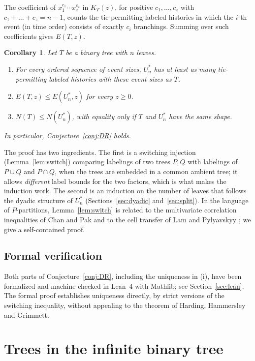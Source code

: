 \documentclass[11pt]{amsart}
\newtheorem{corollary}[theorem]{Corollary}
\theoremstyle{definition}
\theoremstyle{remark}
\begin{document}
The coefficient of $x_1^{c_1}\cdots x_z^{c_z}$ in $K_T(z)$, for positive $c_1,\dots,c_z$ with $c_1+\dots+c_z=n-1$, counts the tie-permitting labeled histories in which the $i$-th event (in time order) consists of exactly $c_i$ branchings.
Summing over such coefficients gives $E(T,z)$.

\begin{corollary}\label{cor:main}
Let $T$ be a binary tree with $n$ leaves.
\begin{enumerate}
\item For every ordered sequence of event sizes, $U^*_n$ has at least as many tie-permitting labeled histories with these event sizes as $T$.
\item $E(T,z)\le E(U^*_n,z)$ for every $z\ge 0$.
\item $N(T)\le N(U^*_n)$, with equality only if $T$ and $U^*_n$ have the same shape.
\end{enumerate}
In particular, Conjecture~\ref{conj:DR} holds.
\end{corollary}

The proof has two ingredients.
The first is a switching injection (Lemma~\ref{lem:switch}) comparing labelings of two trees $P,Q$ with labelings of $P\cup Q$ and $P\cap Q$, when the trees are embedded in a common ambient tree; it allows \emph{different} label bounds for the two factors, which is what makes the induction work.
The second is an induction on the number of leaves that follows the dyadic structure of $U^*_n$ (Sections~\ref{sec:dyadic} and~\ref{sec:split}).
In the language of $P$-partitions, Lemma~\ref{lem:switch} is related to the multivariate correlation inequalities of Chan and Pak \cite{ChanPak} and to the cell transfer of Lam and Pylyavskyy \cite{LP}; we give a self-contained proof.

\subsection*{Formal verification}
Both parts of Conjecture~\ref{conj:DR}, including the uniqueness in (i), have been formalized and machine-checked in Lean~4 with Mathlib; see Section~\ref{sec:lean}.
The formal proof establishes uniqueness directly, by strict versions of the switching inequality, without appealing to the theorem of Harding, Hammersley and Grimmett.

\section{Trees in the infinite binary tree}\label{sec:trees}
\end{document}
